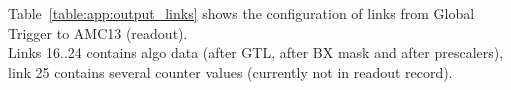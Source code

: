 

Table~\ref{table:app:output_links} shows the configuration of links from Global Trigger to AMC13 (readout).\\
Links 16..24 contains algo data (after GTL, after BX mask and after prescalers), link 25 contains several counter values (currently not in readout record).

